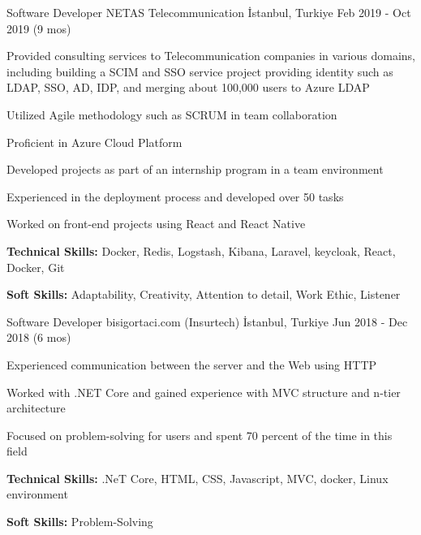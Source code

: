 \begin{cventries}
  \cventry
    {Software Developer} %
    {NETAS Telecommunication} %
    {İstanbul, Turkiye} %
    {Feb 2019 - Oct 2019 (9 mos)} %
    {
      \begin{cvitems} %
        \item {Provided consulting services to Telecommunication companies in various domains, including building a SCIM and SSO service project providing identity such as LDAP, SSO, AD, IDP, and merging about 100,000 users to Azure LDAP}
        \item {Utilized Agile methodology such as SCRUM in team collaboration}
        \item {Proficient in Azure Cloud Platform}
        \item {Developed projects as part of an internship program in a team environment}
        \item {Experienced in the deployment process and developed over 50 tasks}
        \item {Worked on front-end projects using React and React Native}
        \item {\textbf{Technical Skills:} Docker, Redis, Logstash, Kibana, Laravel, keycloak, React, Docker, Git}
        \item {\textbf{Soft Skills:} Adaptability, Creativity, Attention to detail, Work Ethic, Listener}
      \end{cvitems}
    }

    \cventry
        {Software Developer} %
        {bisigortaci.com (Insurtech)} %
        {İstanbul, Turkiye} %
        {Jun 2018 - Dec 2018 (6 mos)} %
    {
        \begin{cvitems} %
            \item {Experienced communication between the server and the Web using HTTP}
            \item {Worked with .NET Core and gained experience with MVC structure and n-tier architecture}
            \item {Focused on problem-solving for users and spent 70 percent of the time in this field}
            \item {\textbf{Technical Skills:} .NeT Core, HTML, CSS, Javascript, MVC, docker, Linux environment}
            \item {\textbf{Soft Skills:} Problem-Solving}
        \end{cvitems}
    }
\end{cventries}
